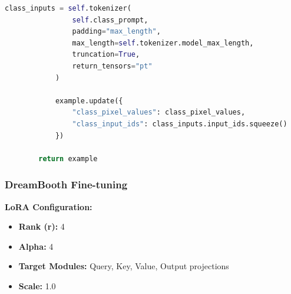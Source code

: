 \documentclass[a4paper,12pt]{article}
\begin{document}
\begin{lstlisting}[language=Python]
            class_inputs = self.tokenizer(
                self.class_prompt,
                padding="max_length",
                max_length=self.tokenizer.model_max_length,
                truncation=True,
                return_tensors="pt"
            )
            
            example.update({
                "class_pixel_values": class_pixel_values,
                "class_input_ids": class_inputs.input_ids.squeeze()
            })
        
        return example
\end{lstlisting}

\subsubsection{DreamBooth Fine-tuning}
\textbf{LoRA Configuration:}
\begin{itemize}
    \item \textbf{Rank (r):} 4
    \item \textbf{Alpha:} 4
    \item \textbf{Target Modules:} Query, Key, Value, Output projections
    \item \textbf{Scale:} 1.0
\end{itemize}
\end{document}
